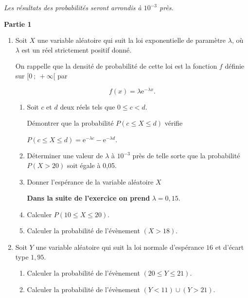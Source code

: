 \documentclass[12pt,frenchb]{article}
\begin{document}
\begin{question}[subtitle={Métropole 2015}]
\emph{Les résultats des probabilités seront arrondis à $10^{-3}$ près.}

\bigskip

\textbf{Partie 1}

\medskip

\begin{enumerate}
\item Soit $X$ une variable aléatoire qui suit la loi exponentielle de paramètre $\lambda$, où $\lambda$ est un réel strictement positif donné.

On rappelle que la densité de probabilité de cette loi est la fonction $f$  définie sur
$[0~;~+ \infty[$ par %

\[f(x) = \lambda\text{e}^{- \lambda x}.\]

	\begin{enumerate}
		\item Soit $c$ et $d$ deux réels tels que $0 \leqslant c < d$.
		
Démontrer que la probabilité $P( c \leqslant X \leqslant d)$ vérifie 

$P(c \leqslant X \leqslant d) = \text{e}^{- \lambda c}   - \text{e}^{- \lambda d}$.
		\item Déterminer une valeur de $\lambda$ à $10^{-3}$ près de telle sorte que la probabilité $P(X > 20)$ soit égale à 0,05.
		\item Donner l'espérance de la variable aléatoire $X$

\medskip
		
\textbf{Dans la suite de l'exercice on prend } \boldmath$\lambda = 0,15$\unboldmath.
		\item Calculer $P(10 \leqslant X \leqslant 20)$.
		\item Calculer la probabilité de l'évènement $(X > 18)$.
	\end{enumerate}
\item Soit $Y$ une variable aléatoire qui suit la loi normale d'espérance $16$ et d'écart type $1,95$.
	\begin{enumerate}
		\item Calculer la probabilité de l'évènement $(20 \leqslant Y \leqslant 21)$.
		\item Calculer la probabilité de l'évènement $(Y < 11) \cup (Y > 21)$.
	\end{enumerate}
\end{enumerate}

\bigskip
	

\end{question}
\end{document}
